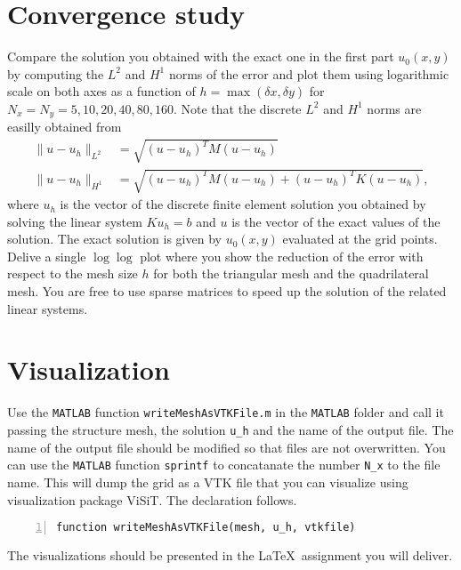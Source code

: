 \documentclass[unicode,11pt,a4paper,oneside,numbers=endperiod,openany]{scrartcl}
\begin{document}
\section{Convergence study}
Compare the solution you obtained with the exact one in the first part $u_0(x,y)$ by computing the 
$L^2$ and $H^1$ norms of the error and plot them using logarithmic scale on both axes
as a function of $h = \max{(\delta x, \delta y)}$ for $N_x = N_y = 5,10,20,40,80,160$.
Note that the discrete $L^2$ and $H^1$ norms are easilly obtained from
\begin{align*}
\|u - u_h\|_{L^2} &= \sqrt{(u-u_h)^T M (u-u_h)} \\
\|u - u_h\|_{H^1} &= \sqrt{(u-u_h)^T M (u-u_h) + (u-u_h)^T K (u-u_h)},
\end{align*}
where $u_h$ is the vector of the discrete finite element solution you 
obtained by solving the linear system $K u_h = b$ and $u$ is the vector
of the exact values of the solution. The exact solution
is given by $u_0(x,y)$ evaluated at the grid points. Delive a single $\log\log$ plot where you show the 
reduction of the error with respect to the mesh size $h$ for both the triangular mesh and the quadrilateral mesh.
You are free to use sparse matrices to speed up the solution of the related linear systems.


\section{Visualization}
Use the \lstinline+MATLAB+ function \lstinline+writeMeshAsVTKFile.m+ in the \lstinline+MATLAB+ folder
and call it passing the structure mesh, the solution \lstinline+u_h+ and the name of the output file.
The name of the output file should be modified so that files are not overwritten. You can use the
\lstinline+MATLAB+ function \lstinline+sprintf+ to concatanate the number \lstinline+N_x+ to the file name.
This will dump the grid as a VTK file that you can visualize using visualization package ViSiT. The declaration follows.
\begin{lstlisting}[numbers=left, numberstyle=\tiny, stepnumber=1, numbersep=10pt]
function writeMeshAsVTKFile(mesh, u_h, vtkfile)
\end{lstlisting}
The visualizations should be presented in the \LaTeX~assignment you will deliver.
\end{document}
